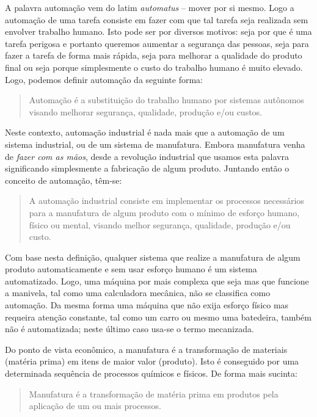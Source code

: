 \label{chap:automacao}
A palavra automação vem do latim \emph{automatus} -- mover por si mesmo. Logo a automação de uma tarefa consiste em fazer com que tal tarefa seja realizada sem envolver trabalho humano. Isto pode ser por diversos motivos: seja por que é uma tarefa perigosa e portanto queremos aumentar a segurança das pessoas, seja para fazer a tarefa de forma mais rápida, seja para melhorar a qualidade do produto final ou seja porque simplesmente o custo do trabalho humano é muito elevado. Logo, podemos definir automação da seguinte forma:
\begin{quote}
  Automação é a substituição do trabalho humano por sistemas autônomos visando melhorar segurança, qualidade, produção e/ou custos.
\end{quote}

Neste contexto, automação industrial é nada mais que a automação de um sistema industrial, ou de um sistema de manufatura. Embora manufatura venha de \emph{fazer com as mãos}, desde a revolução industrial que usamos esta palavra significando simplesmente a fabricação de algum produto. Juntando então o conceito de automação, têm-se:
\begin{quote}
  A automação industrial consiste em implementar os processos necessários para a manufatura de algum produto com o mínimo de esforço humano, físico ou mental, visando melhor segurança, qualidade, produção e/ou custo.
\end{quote}

Com base nesta definição, qualquer sistema que realize a manufatura de algum produto automaticamente e sem usar esforço humano é um sistema automatizado. Logo, uma máquina por mais complexa que seja mas que funcione a manivela, tal como uma calculadora mecânica, não se classifica como automação. Da mesma forma uma máquina que não exija esforço físico mas requeira atenção constante, tal como um carro ou mesmo uma batedeira, também não é automatizada; neste último caso usa-se o termo mecanizada.

Do ponto de vista econômico, a manufatura é a transformação de materiais (matéria prima) em itens de maior valor (produto). Isto é conseguido por uma determinada sequência de processos químicos e físicos. De forma mais sucinta:
\begin{quote}
	Manufatura é a transformação de matéria prima em produtos pela aplicação de um ou mais processos.
\end{quote}

